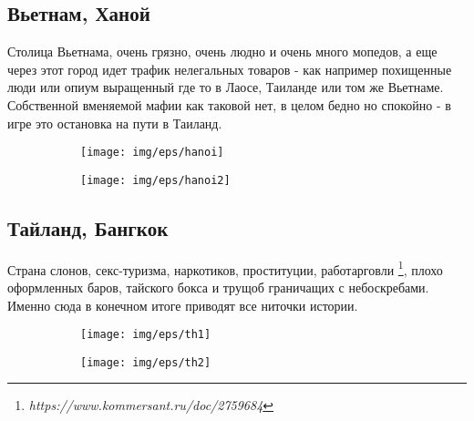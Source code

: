 \documentclass[11pt]{report}
\begin{document}
\subsection{Вьетнам, Ханой}
Столица Вьетнама, очень грязно, очень людно и очень много мопедов, а еще через этот город идет трафик нелегальных товаров - как например похищенные люди или опиум выращенный где то в Лаосе, Таиланде или том же Вьетнаме. Собственной вменяемой мафии как таковой нет, в целом бедно но спокойно - в игре это остановка на пути в Таиланд.\\
\begin{center}
	\begin{figure}[h]
		\begin{subfigure}{.77\linewidth}
			\texttt{[image: img/eps/hanoi]}
		\end{subfigure}
	\end{figure}
\end{center}		
\begin{center}
	\begin{figure}[h]
		\begin{subfigure}{.77\linewidth}
			\texttt{[image: img/eps/hanoi2]}
		\end{subfigure}
	\end{figure}
\end{center}	

\clearpage
\subsection{Тайланд, Бангкок}
Страна слонов, секс-туризма, наркотиков, проституции, работарговли \footnote{\emph{https://www.kommersant.ru/doc/2759684}}, плохо оформленных баров, тайского бокса и трущоб граничащих с небоскребами. Именно сюда в конечном итоге приводят все ниточки истории.
\setlength{\intextsep}{.5pt}
\begin{center}
	\begin{figure}[h]
		\begin{subfigure}{.94\linewidth}
			\texttt{[image: img/eps/th1]}
		\end{subfigure}
	\end{figure}
\end{center}	
\begin{center}
	\begin{figure}[h]
		\begin{subfigure}{.94\linewidth}
			\texttt{[image: img/eps/th2]}
		\end{subfigure}
	\end{figure}
\end{center}	
\end{document}
